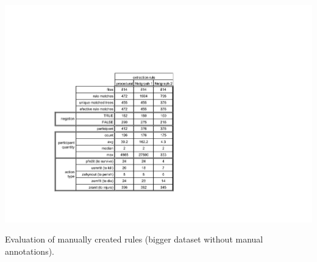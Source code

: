 \begin{table}[t!]
	\centering
		\includegraphics[angle=-90,width=0.75\hsize]{tab_manual_rules}
	\caption{Evaluation of manually created rules (bigger dataset without manual annotations).}
	\label{tab:manual_tab_manual_rules}
\end{table}


